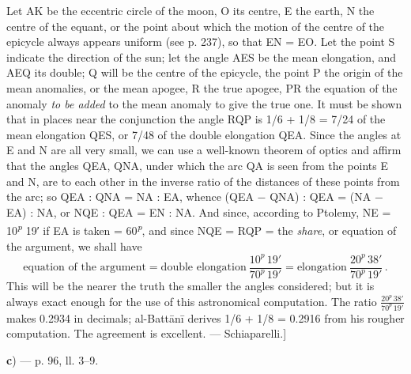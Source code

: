 \documentclass[11pt]{article}
\newcommand{\Pg}[1]{\marginpar{\footnotesize\color{gray}#1}}
\begin{document}
\par \Pg{I 273}Let AK be the eccentric circle of the moon, O its centre, E the earth, N the centre of the equant, or the point about which the motion of the centre of the epicycle always appears uniform (see p. 237), so that EN = EO. Let the point S indicate the direction of the sun; let the angle AES be the mean elongation, and AEQ its double; Q will be the centre of the epicycle, the point P the origin of the mean anomalies, or the mean apogee, R the true apogee, PR the equation of the anomaly \emph{to be added} to the mean anomaly to give the true one. It must be shown that in places near the conjunction the angle RQP is 1/6 + 1/8 = 7/24 of the mean elongation QES, or 7/48 of the double elongation QEA. Since the angles at E and N are all very small, we can use a well-known theorem of optics and affirm that the angles QEA, QNA, under which the arc QA is seen from the points E and N, are to each other in the inverse ratio of the distances of these points from the arc; so QEA : QNA = NA : EA, whence (QEA − QNA) : QEA = (NA − EA) : NA, or NQE : QEA = EN : NA. And since, according to Ptolemy, NE = 10\textsuperscript{\itshape p} 19′ if EA is taken = 60\textsuperscript{\itshape p}, and since NQE = RQP = the \emph{share}, or equation of the argument, we shall have \[ \text{equation of the argument} = \text{double elongation}\ \frac{10^{p}\,19'}{70^{p}\,19'} = \text{elongation}\ \frac{20^{p}\,38'}{70^{p}\,19'}\,. \] This will be the nearer the truth the smaller the angles considered; but it is always exact enough for the use of this astronomical computation. The ratio $\frac{20^{p}\,38'}{70^{p}\,19'}$ makes 0.2934 in decimals; al-Battānī derives 1/6 + 1/8 = 0.2916 from his rougher computation. The agreement is excellent. — Schiaparelli.]\par
\par\begin{center}\textbf{c}) — p. 96, ll. 3–9.\end{center}
\begin{center}\end{center}
\end{document}
